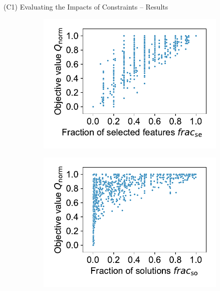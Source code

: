 \documentclass[en, navbarinline, handout]{sdqbeamer}
\begin{document}
\begin{frame}[t]{(C1) Evaluating the Impacts of Constraints -- Results}
	\begin{figure}[htb]
		\centering
		\captionsetup{justification=centering}
		\begin{subfigure}{0.48\textwidth}
			\centering
			\includegraphics[width=\textwidth, trim={0 15 0 10}, clip]{plots/syn-selected-vs-objective.pdf}
		\end{subfigure}
		\hfill
		\begin{subfigure}{0.48\textwidth}
			\centering
			\includegraphics[width=\textwidth, trim={0 15 0 10}, clip]{plots/syn-solutions-vs-objective.pdf}

\end{subfigure}
\end{figure}
\end{frame}
\end{document}
